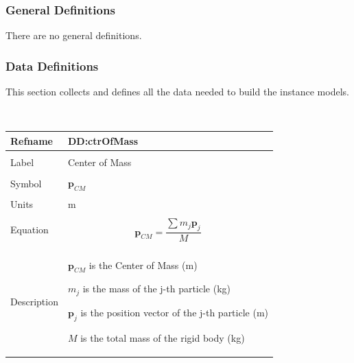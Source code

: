 \documentclass[12pt]{article}
\begin{document}
\subsubsection{General Definitions}
\label{Sec:GDs}
There are no general definitions.
\subsubsection{Data Definitions}
\label{Sec:DDs}
This section collects and defines all the data needed to build the instance models.
\par~

\noindent \begin{minipage}{\textwidth}
\begin{tabular}{p{} p{}}
\toprule \textbf{Refname} & \textbf{DD:ctrOfMass}
\label{DD:ctrOfMass}
\\ \midrule \\
Label & Center of Mass
        \\ \midrule \\
        Symbol & ${\mathbf{p}_{CM}}$
                 \\ \midrule \\
                 Units & m
                         \\ \midrule \\
                         Equation & \begin{displaymath}
                                    {\mathbf{p}_{CM}}=\frac{\displaystyle\sum{{m_{j}} {\mathbf{p}_{j}}}}{M}
                                    \end{displaymath}
                                    \\ \midrule \\
                                    Description & \begin{symbDescription}
                                                  \item{${\mathbf{p}_{CM}}$ is the Center of Mass (m)}
                                                  \item{${m_{j}}$ is the mass of the j-th particle (kg)}
                                                  \item{${\mathbf{p}_{j}}$ is the position vector of the j-th particle (m)}
                                                  \item{$M$ is the total mass of the rigid body (kg)}
                                                  \end{symbDescription}

\end{tabular}
\end{minipage}
\end{document}
